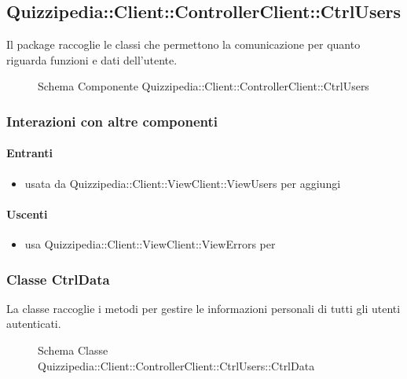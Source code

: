 \subsection{Quizzipedia::Client::ControllerClient::CtrlUsers}
Il package raccoglie le classi che permettono la comunicazione per quanto riguarda funzioni e dati dell'utente.
\begin{figure}[H]
\centering
\noindent{}
\caption[Schema Componente Quizzipedia::Client::ControllerClient::CtrlUsers]{Schema Componente Quizzipedia::Client::ControllerClient::CtrlUsers}
\end{figure}
\subsubsection{Interazioni con altre componenti}
\paragraph{Entranti}
\begin{itemize}
\item usata da Quizzipedia::Client::ViewClient::ViewUsers per aggiungi
\end{itemize}
\paragraph{Uscenti}
\begin{itemize}
\item usa Quizzipedia::Client::ViewClient::ViewErrors per 
\end{itemize}
\subsubsection{Classe CtrlData}
La classe raccoglie i metodi per gestire le informazioni personali di tutti gli utenti autenticati.
\begin{figure}[H]
\centering
\noindent{}
\caption[Schema Classe CtrlData]{Schema Classe Quizzipedia::Client::ControllerClient::CtrlUsers::CtrlData}
\end{figure}
